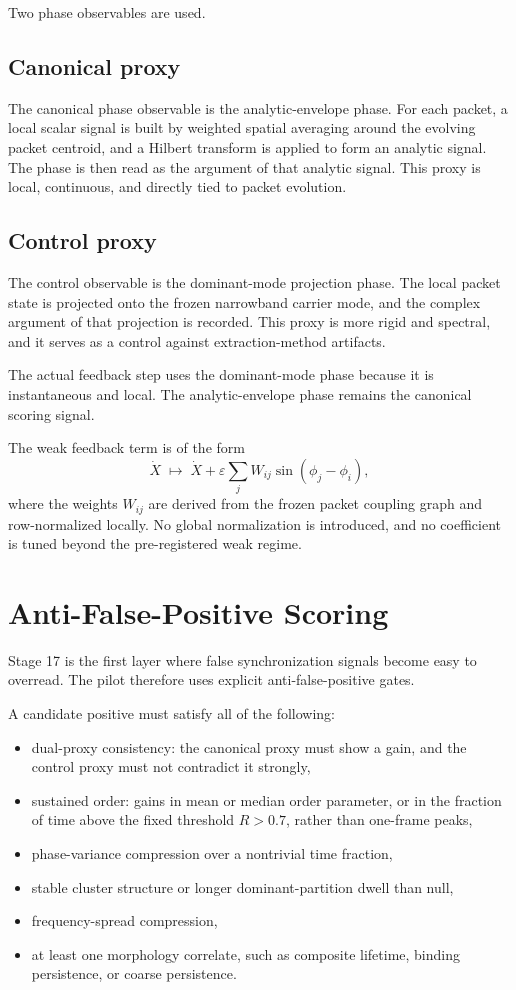 \documentclass[11pt]{article}
\begin{document}
Two phase observables are used.

\subsection{Canonical proxy}

The canonical phase observable is the analytic-envelope phase. For each packet, a local scalar signal is built by weighted spatial averaging around the evolving packet centroid, and a Hilbert transform is applied to form an analytic signal. The phase is then read as the argument of that analytic signal. This proxy is local, continuous, and directly tied to packet evolution.

\subsection{Control proxy}

The control observable is the dominant-mode projection phase. The local packet state is projected onto the frozen narrowband carrier mode, and the complex argument of that projection is recorded. This proxy is more rigid and spectral, and it serves as a control against extraction-method artifacts.

The actual feedback step uses the dominant-mode phase because it is instantaneous and local. The analytic-envelope phase remains the canonical scoring signal.

The weak feedback term is of the form
\[
\dot X \;\mapsto\; \dot X + \varepsilon \sum_j W_{ij}\sin(\phi_j - \phi_i),
\]
where the weights $W_{ij}$ are derived from the frozen packet coupling graph and row-normalized locally. No global normalization is introduced, and no coefficient is tuned beyond the pre-registered weak regime.

\section{Anti-False-Positive Scoring}

Stage 17 is the first layer where false synchronization signals become easy to overread. The pilot therefore uses explicit anti-false-positive gates.

A candidate positive must satisfy all of the following:
\begin{itemize}
\item dual-proxy consistency: the canonical proxy must show a gain, and the control proxy must not contradict it strongly,
\item sustained order: gains in mean or median order parameter, or in the fraction of time above the fixed threshold $R>0.7$, rather than one-frame peaks,
\item phase-variance compression over a nontrivial time fraction,
\item stable cluster structure or longer dominant-partition dwell than null,
\item frequency-spread compression,
\item at least one morphology correlate, such as composite lifetime, binding persistence, or coarse persistence.
\end{itemize}
\end{document}
